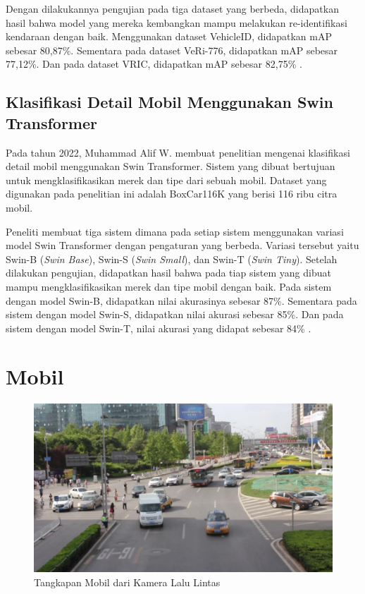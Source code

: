 Dengan dilakukannya pengujian pada tiga dataset yang berbeda, didapatkan hasil bahwa model yang mereka kembangkan 
mampu melakukan re-identifikasi kendaraan dengan baik. Menggunakan dataset VehicleID, didapatkan mAP sebesar 80,87\%. 
Sementara  pada dataset VeRi-776, didapatkan mAP sebesar 77,12\%. Dan pada dataset VRIC, didapatkan mAP sebesar 
82,75\% \parencite{Rong2021}.

\subsection{Klasifikasi Detail Mobil Menggunakan Swin Transformer}

Pada tahun 2022, Muhammad Alif W. membuat penelitian mengenai klasifikasi detail mobil menggunakan Swin Transformer. 
Sistem yang dibuat bertujuan untuk mengklasifikasikan merek dan tipe dari sebuah mobil. Dataset yang digunakan 
pada penelitian ini adalah BoxCar116K yang berisi 116 ribu citra mobil.

Peneliti membuat tiga sistem dimana pada setiap sistem menggunakan variasi model Swin Transformer dengan pengaturan 
yang berbeda. Variasi tersebut yaitu Swin-B (\emph{Swin Base}), Swin-S (\emph{Swin Small}), dan Swin-T (\emph{Swin Tiny}). 
Setelah dilakukan pengujian, didapatkan hasil bahwa pada tiap sistem yang dibuat mampu mengklasifikasikan merek 
dan tipe mobil dengan baik. Pada sistem dengan model Swin-B, didapatkan nilai akurasinya sebesar 87\%. 
Sementara pada sistem dengan model Swin-S, didapatkan nilai akurasi sebesar 85\%. Dan pada sistem dengan 
model Swin-T, nilai akurasi yang didapat sebesar 84\% \parencite{Wicaksono2022}.

\section{Mobil}
\label{sec:mobil}

\begin{figure}[ht]
  \centering
  \includegraphics[scale=0.35]{gambar/Mobil2.jpg}
  \caption{Tangkapan Mobil dari Kamera Lalu Lintas}
  \label{fig:tangkapanmobildarikameralalulintas}
\end{figure}

